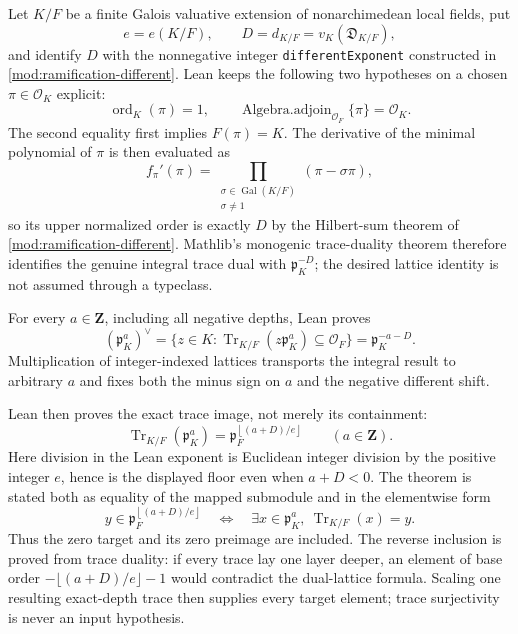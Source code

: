 \begin{theorem}\label{mod:ramification-traceideals}
Let $K/F$ be a finite Galois valuative extension of nonarchimedean local
fields, put
\[
 e=e(K/F),\qquad D=d_{K/F}=v_K(\mathfrak D_{K/F}),
\]
and identify $D$ with the nonnegative integer
\texttt{differentExponent} constructed in
\ref{mod:ramification-different}.  Lean keeps the following two hypotheses
on a chosen $\pi\in\mathcal O_K$ explicit:
\[
 \operatorname{ord}_K(\pi)=1,
 \qquad
 \operatorname{Algebra.adjoin}_{\mathcal O_F}\{\pi\}=\mathcal O_K.
\]
The second equality first implies $F(\pi)=K$.  The derivative of the
minimal polynomial of $\pi$ is then evaluated as
\[
 f_\pi'(\pi)
 =\prod_{\substack{\sigma\in\operatorname{Gal}(K/F)\\\sigma\ne1}}
   (\pi-\sigma\pi),
\]
so its upper normalized order is exactly $D$ by the Hilbert-sum theorem of
\ref{mod:ramification-different}.  Mathlib's monogenic trace-duality theorem
therefore identifies the genuine integral trace dual with
$\mathfrak p_K^{-D}$; the desired lattice identity is not assumed through a
typeclass.

For every $a\in\mathbf Z$, including all negative depths, Lean proves
\[
 \boxed{
 \left(\mathfrak p_K^a\right)^\vee
 =\{z\in K:\operatorname{Tr}_{K/F}(z\mathfrak p_K^a)
                    \subseteq\mathcal O_F\}
 =\mathfrak p_K^{-a-D}.}
\]
Multiplication of integer-indexed lattices transports the integral result to
arbitrary $a$ and fixes both the minus sign on $a$ and the negative
different shift.

Lean then proves the exact trace image, not merely its containment:
\[
 \boxed{
 \operatorname{Tr}_{K/F}(\mathfrak p_K^a)
 =\mathfrak p_F^{\left\lfloor(a+D)/e\right\rfloor}}
 \qquad(a\in\mathbf Z).
\]
Here division in the Lean exponent is Euclidean integer division by the
positive integer $e$, hence is the displayed floor even when $a+D<0$.
The theorem is stated both as equality of the mapped submodule and in the
elementwise form
\[
 y\in\mathfrak p_F^{\left\lfloor(a+D)/e\right\rfloor}
 \quad\Longleftrightarrow\quad
 \exists x\in\mathfrak p_K^a,\ \operatorname{Tr}_{K/F}(x)=y.
\]
Thus the zero target and its zero preimage are included.  The reverse
inclusion is proved from trace duality: if every trace lay one layer deeper,
an element of base order $-\lfloor(a+D)/e\rfloor-1$ would contradict the
dual-lattice formula.  Scaling one resulting exact-depth trace then supplies
every target element; trace surjectivity is never an input hypothesis.


\end{theorem}
